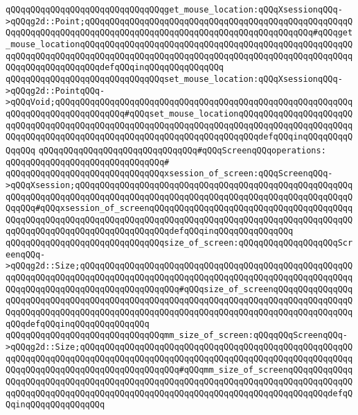 \verb|qQQqqQQqqQQqqQQqqQQqqQQqqQQqqQQqget_mouse_location:qQQqXsessionqQQq->qQQqg2d::Point;qQQqqQQqqQQqqQQqqQQqqQQqqQQqqQQqqQQqqQQqqQQqqQQqqQQqqQQqqQQqqQQqqQQqqQQqqQQqqQQqqQQqqQQqqQQqqQQqqQQqqQQqqQQqqQQqqQQq#qQQqget_mouse_locationqQQqqQQqqQQqqQQqqQQqqQQqqQQqqQQqqQQqqQQqqQQqqQQqqQQqqQQqqQQqqQQqqQQqqQQqqQQqqQQqqQQqqQQqqQQqqQQqqQQqqQQqqQQqqQQqqQQqqQQqqQQqqQQqqQQqqQQqqQQqqQQqdefqQQqinqQQqqQQqqQQqqQQq|\newline
\verb|qQQqqQQqqQQqqQQqqQQqqQQqqQQqqQQqset_mouse_location:qQQqXsessionqQQq->qQQqg2d::PointqQQq->qQQqVoid;qQQqqQQqqQQqqQQqqQQqqQQqqQQqqQQqqQQqqQQqqQQqqQQqqQQqqQQqqQQqqQQqqQQqqQQqqQQqqQQqqQQq#qQQqset_mouse_locationqQQqqQQqqQQqqQQqqQQqqQQqqQQqqQQqqQQqqQQqqQQqqQQqqQQqqQQqqQQqqQQqqQQqqQQqqQQqqQQqqQQqqQQqqQQqqQQqqQQqqQQqqQQqqQQqqQQqqQQqqQQqqQQqqQQqqQQqqQQqqQQqdefqQQqinqQQqqQQqqQQqqQQq|\newline
\newline
\verb|qQQqqQQqqQQqqQQqqQQqqQQqqQQqqQQq#qQQqScreenqQQqoperations:|\newline
\verb|qQQqqQQqqQQqqQQqqQQqqQQqqQQqqQQq#|\newline
\verb|qQQqqQQqqQQqqQQqqQQqqQQqqQQqqQQqxsession_of_screen:qQQqScreenqQQq->qQQqXsession;qQQqqQQqqQQqqQQqqQQqqQQqqQQqqQQqqQQqqQQqqQQqqQQqqQQqqQQqqQQqqQQqqQQqqQQqqQQqqQQqqQQqqQQqqQQqqQQqqQQqqQQqqQQqqQQqqQQqqQQqqQQqqQQqqQQq#qQQqxsession_of_screenqQQqqQQqqQQqqQQqqQQqqQQqqQQqqQQqqQQqqQQqqQQqqQQqqQQqqQQqqQQqqQQqqQQqqQQqqQQqqQQqqQQqqQQqqQQqqQQqqQQqqQQqqQQqqQQqqQQqqQQqqQQqqQQqqQQqqQQqqQQqqQQqdefqQQqinqQQqqQQqqQQqqQQq|\newline
\verb|qQQqqQQqqQQqqQQqqQQqqQQqqQQqqQQqsize_of_screen:qQQqqQQqqQQqqQQqqQQqScreenqQQq->qQQqg2d::Size;qQQqqQQqqQQqqQQqqQQqqQQqqQQqqQQqqQQqqQQqqQQqqQQqqQQqqQQqqQQqqQQqqQQqqQQqqQQqqQQqqQQqqQQqqQQqqQQqqQQqqQQqqQQqqQQqqQQqqQQqqQQqqQQqqQQqqQQqqQQqqQQqqQQqqQQqqQQqqQQq#qQQqsize_of_screenqQQqqQQqqQQqqQQqqQQqqQQqqQQqqQQqqQQqqQQqqQQqqQQqqQQqqQQqqQQqqQQqqQQqqQQqqQQqqQQqqQQqqQQqqQQqqQQqqQQqqQQqqQQqqQQqqQQqqQQqqQQqqQQqqQQqqQQqqQQqqQQqqQQqqQQqqQQqqQQqdefqQQqinqQQqqQQqqQQqqQQq|\newline
\verb|qQQqqQQqqQQqqQQqqQQqqQQqqQQqqQQqmm_size_of_screen:qQQqqQQqScreenqQQq->qQQqg2d::Size;qQQqqQQqqQQqqQQqqQQqqQQqqQQqqQQqqQQqqQQqqQQqqQQqqQQqqQQqqQQqqQQqqQQqqQQqqQQqqQQqqQQqqQQqqQQqqQQqqQQqqQQqqQQqqQQqqQQqqQQqqQQqqQQqqQQqqQQqqQQqqQQqqQQqqQQqqQQqqQQq#qQQqmm_size_of_screenqQQqqQQqqQQqqQQqqQQqqQQqqQQqqQQqqQQqqQQqqQQqqQQqqQQqqQQqqQQqqQQqqQQqqQQqqQQqqQQqqQQqqQQqqQQqqQQqqQQqqQQqqQQqqQQqqQQqqQQqqQQqqQQqqQQqqQQqqQQqqQQqqQQqdefqQQqinqQQqqQQqqQQqqQQq|\newline
